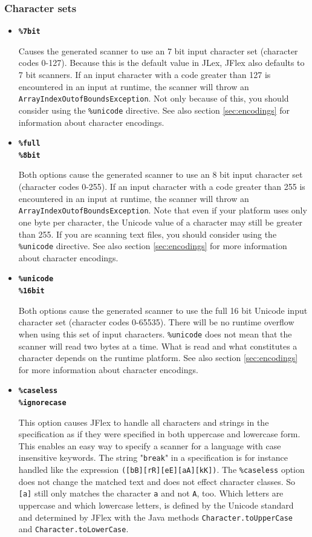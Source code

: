 \documentclass[11pt]{scrartcl}
\begin{document}
\subsubsection{Character sets\label{CharacterSets}}
\begin{itemize}
\item
{\bf \texttt{\%7bit}}

Causes the generated scanner to use an 7 bit input character set (character
codes 0-127). Because this is the default value in JLex, JFlex also defaults
to 7 bit scanners. If an input character with a code greater than 127 is
encountered in an input at runtime, the scanner will throw an \texttt{ArrayIndexOutofBoundsException}.
Not only because of this, you should consider using the \texttt{\%unicode} directive. 
See also section \ref{sec:encodings} for information about character encodings.
 
\item
{\bf \texttt{\%full}}\\
{\bf \texttt{\%8bit}}

Both options cause the generated scanner to use an 8 bit input character
set (character codes 0-255). If an input character with a code greater
than 255 is encountered in an input at runtime, the scanner will throw
an \texttt{ArrayIndexOutofBoundsException}. Note that even if your platform
uses only one byte per character, the Unicode value of a character may
still be greater than 255. If you are scanning text files, you should
consider using the \texttt{\%unicode} directive. See also section \ref{sec:encodings}
for more information about character encodings.
 
\item
{\bf \texttt{\%unicode}}\\
{\bf \texttt{\%16bit}}

Both options cause the generated scanner to use the full 16 bit Unicode input
character set (character codes 0-65535). There will be no runtime overflow when
using this set of input characters. \texttt{\%unicode} does not mean that the
scanner will read two bytes at a time. What is read and what constitutes a
character depends on the runtime platform. See also section \ref{sec:encodings}
for more information about character encodings.
 
\label{caseless}
\item
{\bf \texttt{\%caseless}}\\
{\bf \texttt{\%ignorecase}}

This option causes JFlex to handle all characters and strings in the
specification as if they were specified in both uppercase and lowercase form.
This enables an easy way to specify a scanner for a language with
case insensitive keywords. The string "\texttt{break}" in a specification is for instance 
handled like the expression \texttt{([bB][rR][eE][aA][kK])}. The \texttt{\%caseless}
option does not change the matched text and does not effect character classes. So
\texttt{[a]} still only matches the character \texttt{a} and not \texttt{A}, too.
Which letters are uppercase and which lowercase letters, is defined by the Unicode standard
and determined by JFlex with the Java methods \texttt{Character.toUpperCase} and 
\texttt{Character.toLowerCase}.


\end{itemize}
\end{document}
